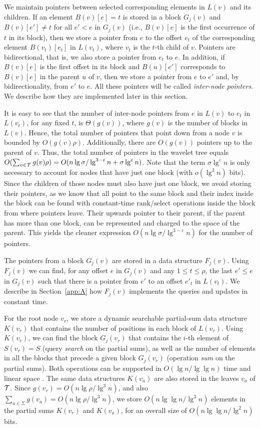 \documentclass[11pt]{article}
\def\idrm#1{\ensuremath{\mathrm{#1}}}
\newcommand{\cT}{{\cal T}}
\newcommand{\cP}{{ K}}
\newcommand{\ra}{\idrm{rank}}
\newcommand{\sel}{\idrm{select}}
\newcommand{\eps}{\varepsilon}
\begin{document}
We maintain pointers between selected corresponding elements in $L(v)$ and its children.  
If  an element $B(v)[e]=t$ is stored in a block $G_j(v)$ and 
$B(v)[e']\not= t$ for all  $e'<e$ in $G_j(v)$ (i.e., $B(v)[e]$ is the first
occurrence of $t$ in its block), then we store 
a pointer from $e$ to the offset $e_t$ of the 
corresponding element $B(v_t)[e_t]$ in $L(v_t)$,
where $v_t$ is the $t$-th child of $v$. 
Pointers are bidirectional, that is, we also store a pointer from $e_t$ to $e$.
In addition, if $B(v)[e]$ is the first offset in its block and $B(u)[e']$ 
corresponds to $B(v)[e]$ in the parent $u$ of $v$, then we store a pointer from
$e$ to $e'$ and, by bidirectionality, from $e'$ to $e$.
All these pointers will be called 
\emph{inter-node pointers}. 
We describe how they are implemented later in this section.

It is easy to see that the number of inter-node pointers from $e$ in $L(v)$ 
to $e_t$ in $L(v_t)$, for any fixed $t$, is $\Theta(g(v))$, where $g(v)$ is the number of blocks 
in $L(v)$. Hence, the total number of pointers that point down from a node 
$v$ is bounded by $O(g(v)\rho)$. Additionally, there are $O(g(v))$ pointers 
up to the parent of $v$. Thus, the total number of pointers 
in the wavelet tree equals $O(\sum_{v\in \cT} g(v)\rho)=
O(n\lg\sigma/\lg^{3-\eps}n+\sigma\lg^\eps n)$. Note that the term
$\sigma\lg^\eps n$ is only necessary to account for nodes that have just
one block (with $o(\lg^3 n)$ bits). Since the children of those nodes
must also have just one block, we avoid storing their pointers, as we know that
all point to the same block and their index inside the block can be found with
constant-time $\ra$/$\sel$ operations inside the block from where pointers 
leave. Their upwards pointer to their parent, if the parent has more than one
block, can be represented and charged to the space of the parent. 
This yields the cleaner expression
$O(n\lg\sigma/\lg^{3-\eps}n)$ for the number of pointers.

The pointers from a block $G_j(v)$ are stored in a data structure $F_j(v)$. Using $F_j(v)$ we can find, for any 
offset $e$ in $G_j(v)$ and any $1\le t\le \rho$, the last 
$e' \le e$ in $G_j(v)$ such that there is a pointer from $e'$ to an 
offset $e'_t$ in $L(v_t)$.  
We describe in Section~\ref{app:A} how $F_j(v)$ implements the queries and 
updates in constant time.

For the root node $v_r$, we store a dynamic searchable partial-sum data 
structure $\cP(v_r)$ that contains the number of positions in each block of 
$L(v_r)$. Using $\cP(v_r)$, we can find the block $G_j(v_r)$ that contains the 
$i$-th element of $S(v_r)=S$ (query {\em search} on the partial sums), as well 
as the number of elements in all the blocks that precede a given block 
$G_j(v_r)$ (operation {\em sum} on the partial sums).
Both operations can be supported in $O(\lg n/\lg \lg n)$ time and linear space
\cite[Lem.~1]{NS10}.
The same data structures 
$\cP(v_a)$ are also stored in the leaves $v_a$ of $\cT$. 
Since $g(v_r) = O(n\lg\rho/\lg^3 n)$, and also $\sum_{a\in\Sigma} g(v_a) =
O(n\lg\rho/\lg^3 n)$, we store $O(n\lg\lg n/\lg^3 n)$ elements in the partial
sums $\cP(v_r)$ and $\cP(v_a)$, for an overall size of $O(n\lg\lg n/\lg^2 n)$
bits.
\end{document}

